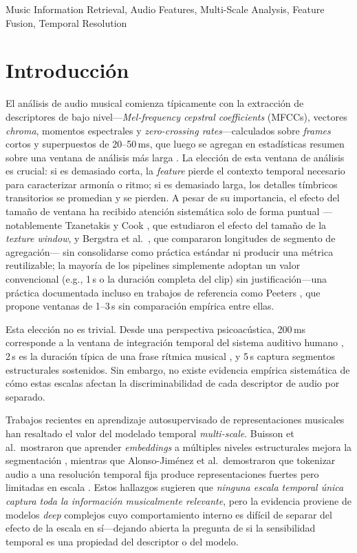 \documentclass[conference]{IEEEtran}
\begin{document}
\begin{IEEEkeywords}
Music Information Retrieval, Audio Features, Multi-Scale Analysis, Feature Fusion, Temporal Resolution
\end{IEEEkeywords}

\section{Introducción}

El análisis de audio musical comienza típicamente con la extracción de  descriptores de bajo nivel---\textit{Mel-frequency cepstral coefficients} (MFCCs), vectores \textit{chroma}, momentos espectrales y 
\textit{zero-crossing rates}---calculados sobre \textit{frames} cortos y superpuestos de 20--50\,ms, que luego se agregan en estadísticas resumen sobre una ventana de análisis más larga \cite{muller2015fundamentals, lerch2012introduction}.
La elección de esta ventana de análisis es crucial: si es demasiado corta, la \textit{feature} pierde el contexto temporal necesario para caracterizar armonía o ritmo; si es demasiado larga, los detalles tímbricos transitorios 
se promedian y se pierden.
A pesar de su importancia, el efecto del tamaño de ventana ha recibido atención sistemática solo de forma puntual ---notablemente Tzanetakis y Cook \cite{tzanetakis2002musical}, que estudiaron el efecto del tamaño de la \textit{texture window}, y Bergstra et al.\ \cite{bergstra2006aggregate}, que compararon longitudes de segmento de agregación--- sin consolidarse como práctica estándar ni producir una métrica reutilizable; la mayoría de los pipelines simplemente adoptan un valor convencional (e.g., 1\,s o la duración completa del clip) sin justificación---una práctica documentada incluso en trabajos de referencia como Peeters \cite{peeters2004large}, que propone ventanas de 1--3\,s sin comparación empírica entre ellas.

Esta elección no es trivial. Desde una perspectiva psicoacústica, 200\,ms corresponde a la ventana de integración temporal del sistema auditivo humano \cite{bregman1994auditory}, 2\,s es la duración 
típica de una frase rítmica musical \cite{fraisse1978time}, y 5\,s captura segmentos estructurales sostenidos. Sin embargo, no existe evidencia empírica sistemática de cómo estas escalas afectan la discriminabilidad de cada descriptor de audio por separado.

Trabajos recientes en aprendizaje autosupervisado de representaciones musicales han resaltado el valor del modelado temporal \textit{multi-scale}.
Buisson et al.\ mostraron que aprender \textit{embeddings} a múltiples niveles estructurales mejora la segmentación \cite{buisson2024self}, mientras que Alonso-Jim\'enez et al.\ demostraron que tokenizar audio a una resolución 
temporal fija produce representaciones fuertes pero limitadas en escala \cite{alonso2025omar}.
Estos hallazgos sugieren que \emph{ninguna escala temporal única captura toda la información musicalmente relevante}, pero la evidencia proviene de modelos \textit{deep} complejos cuyo comportamiento interno es difícil de separar del 
efecto de la escala en sí---dejando abierta la pregunta de si la sensibilidad temporal es una propiedad del descriptor o del modelo.
\end{document}
